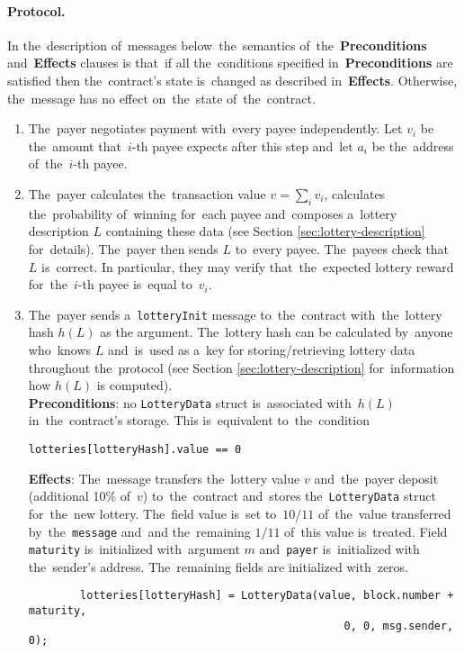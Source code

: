 \documentclass[a4paper]{article}
\newcommand{\lotteryhash}[1]{h({#1})}
\begin{document}
\paragraph{Protocol.}
    In the~description of~messages below~the~semantics of~the~\textbf{Preconditions} and~\textbf{Effects} clauses is
    that~if all the~conditions specified in~\textbf{Preconditions} are satisfied then the~contract's state is~changed
    as described in~\textbf{Effects}. Otherwise, the~message has no effect on~the~state of~the~contract.
    \begin{enumerate}
        \item The~payer negotiates payment with~every payee independently. Let $v_i$ be the~amount that~$i$-th payee
            expects after this step and~let $a_i$ be the~address of~the~$i$-th payee.
        \item The~payer calculates the~transaction value $v = \sum_i v_i$, calculates the~probability of~winning
            for~each payee and~composes a~lottery description $L$ containing these data (see Section
            \ref{sec:lottery-description} for~details). The~payer then sends $L$ to~every payee. The~payees check that~$L$
            is~correct. In particular, they may verify that~the~expected lottery reward for~the~$i$-th payee is~equal
            to~$v_i$.
        \item The~payer sends a~\texttt{lotteryInit} message to~the~contract with~the~lottery hash $\lotteryhash{L}$ as the
          argument. The~lottery hash can be calculated by~anyone who~knows $L$ and~is~used as a~key for
          storing/retrieving lottery data throughout the~protocol (see Section \ref{sec:lottery-description} for~information
          how $\lotteryhash{L}$ is computed).\\
            \textbf{Preconditions}: no \texttt{LotteryData} struct is~associated with~$\lotteryhash{L}$ in~the~contract's
            storage. This is~equivalent to~the~condition
            \begin{center}
	      \lstinline!lotteries[lotteryHash].value == 0!
            \end{center}
            \textbf{Effects}: The~message transfers the~lottery value $v$ and~the~payer deposit (additional 10\%
            of~$v$) to~the~contract and~stores the~\texttt{LotteryData} struct for~the~new lottery. The~field value
            is~set to~$10/11$ of~the~value transferred by~the~\texttt{message} and~and the~remaining $1/11$ of~this value
            is~treated. Field \texttt{maturity} is~initialized with~argument $m$ and~\texttt{payer} is~initialized with
            the~sender's address. The~remaining fields are initialized with~zeros.
            \noindent\begin{lstlisting}
        lotteries[lotteryHash] = LotteryData(value, block.number + maturity,
                                                 0, 0, msg.sender, 0);
            \end{lstlisting}


\end{enumerate}
\end{document}
